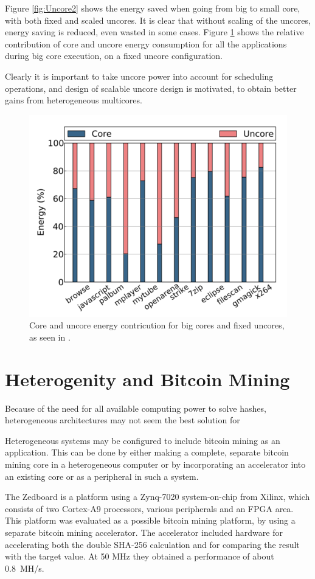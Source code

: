 Figure \ref{fig:Uncore2} shows the energy saved when going from big to small core, with both fixed and scaled uncores.
It is clear that without scaling of the uncores, energy saving is reduced, even wasted in some cases.
Figure \ref{fig:Uncore3} shows the relative contribution of core and uncore energy consumption for all the applications during big core execution, on a fixed uncore configuration.

Clearly it is important to take uncore power into account for scheduling operations, and design of scalable uncore design is motivated, to obtain better gains from heterogeneous multicores. 

\begin{figure}[htb]
    \centering
    \includegraphics[width=1.0\textwidth]{Figures/Heterogeneous/Uncore3}
    \caption{Core and uncore energy contricution for big cores and fixed uncores, as seen in \cite{heterogeneous-uncore}.}
    \label{fig:Uncore3}
\end{figure}

\section{Heterogenity and Bitcoin Mining}

Because of the need for all available computing power to solve hashes, heterogeneous architectures
may not seem the best solution for 

Heterogeneous systems may be configured to include bitcoin mining as an application. This can be
done by either making a complete, separate bitcoin mining core in a heterogeneous computer
or by incorporating an accelerator into an existing core or as a peripheral in such a system.

The Zedboard is a platform using a Zynq-7020 system-on-chip from Xilinx, which consists of
two Cortex-A9 processors, various peripherals and an FPGA area. This platform was evaluated
as a possible bitcoin mining platform, by using a separate bitcoin mining
accelerator. The accelerator included hardware for accelerating both the double SHA-256 calculation
and for comparing the result with the target value. At 50 MHz they obtained a performance of about
0.8~MH/s. \cite{xcell-bitcoin,standridge-master}

